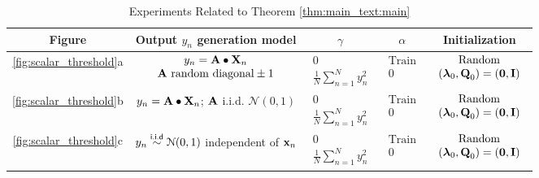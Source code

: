 \documentclass[11pt]{article}
\theoremstyle{plain}
\theoremstyle{plain}
\numberwithin{equation}{section}
\numberwithin{lemma}{section}
\numberwithin{theorem}{section}
\numberwithin{corollary}{section}
\numberwithin{observation}{section}
\numberwithin{definition}{section}
\numberwithin{example}{section}
\begin{document}
\begin{table}
\caption{Experiments Related to Theorem \ref{thm:main_text:main}}
\label{tab:main} 
\begin{tabular}{ccccc}
\toprule
Figure & Output $y_n$ generation model &   $\gamma$ & $\alpha$ & Initialization \\
\midrule
\ref{fig:scalar_threshold}a & 
$\begin{array}{c}
y_n = \Mx{A}\bullet \Mx{X}_n \\ 
\Mx{A} \text{ random diagonal}  \pm1     
\end{array}$ &        
$\begin{array}{c}
     0  \\
     \frac{1}{N}\sum_{n=1}^N y_n^2
\end{array} $                         &   $\begin{array}{c}
      \text{Train}   \\
     0
\end{array} $    & $\begin{array}{c}
      \text{Random}   \\
     (\V{\lambda}_0,\Mx{Q}_0) = (\Mx{0},\Mx{I}) 
\end{array} $ \\
\midrule
\ref{fig:scalar_threshold}b & $y_n = \Mx{A}\bullet \Mx{X}_n$; $\Mx{A}$ i.i.d. $\mathcal{N}(0,1)$     &        $\begin{array}{c}
     0  \\
     \frac{1}{N}\sum_{n=1}^N y_n^2
\end{array} $                         &   $\begin{array}{c}
      \text{Train}   \\
     0
\end{array} $    & $\begin{array}{c}
      \text{Random}   \\
     (\V{\lambda}_0,\Mx{Q}_0) = (\Mx{0},\Mx{I}) 
\end{array} $ \\
\midrule
\ref{fig:scalar_threshold}c & $y_n \overset{\text{\sf i.i.d}}{\sim}\mathcal{N}(0,1)$ independent of $\V{x}_n$     &        $\begin{array}{c}
     0  \\
     \frac{1}{N}\sum_{n=1}^N y_n^2
\end{array} $                         &   $\begin{array}{c}
      \text{Train}   \\
     0
\end{array} $    & $\begin{array}{c}
      \text{Random}   \\
     (\V{\lambda}_0,\Mx{Q}_0) = (\Mx{0},\Mx{I}) 
\end{array} $\\
\bottomrule
\end{tabular}\\
\end{table}   
\end{document}

